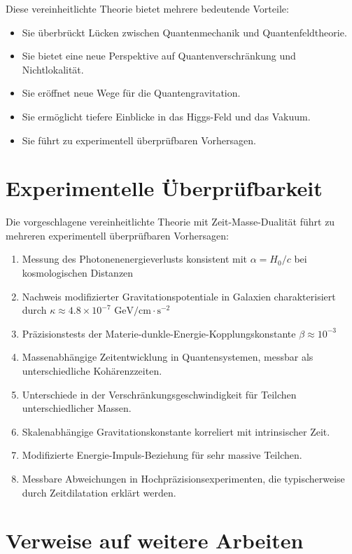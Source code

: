 \documentclass{article}
\begin{document}
	Diese vereinheitlichte Theorie bietet mehrere bedeutende Vorteile:
	\begin{itemize}
		\item Sie überbrückt Lücken zwischen Quantenmechanik und Quantenfeldtheorie.
		\item Sie bietet eine neue Perspektive auf Quantenverschränkung und Nichtlokalität.
		\item Sie eröffnet neue Wege für die Quantengravitation.
		\item Sie ermöglicht tiefere Einblicke in das Higgs-Feld und das Vakuum.
		\item Sie führt zu experimentell überprüfbaren Vorhersagen.
	\end{itemize}
	
	\section{Experimentelle Überprüfbarkeit}
	
	Die vorgeschlagene vereinheitlichte Theorie mit Zeit-Masse-Dualität führt zu mehreren experimentell überprüfbaren Vorhersagen:
	
	\begin{enumerate}
		\item Messung des Photonenenergieverlusts konsistent mit $\alpha = H_0/c$ bei kosmologischen Distanzen
		\item Nachweis modifizierter Gravitationspotentiale in Galaxien charakterisiert durch $\kappa \approx 4.8 \times 10^{-7} \text{ GeV/cm}\cdot\text{s}^{-2}$
		\item Präzisionstests der Materie-dunkle-Energie-Kopplungskonstante $\beta \approx 10^{-3}$
		\item Massenabhängige Zeitentwicklung in Quantensystemen, messbar als unterschiedliche Kohärenzzeiten.
		\item Unterschiede in der Verschränkungsgeschwindigkeit für Teilchen unterschiedlicher Massen.
		\item Skalenabhängige Gravitationskonstante korreliert mit intrinsischer Zeit.
		\item Modifizierte Energie-Impuls-Beziehung für sehr massive Teilchen.
		\item Messbare Abweichungen in Hochpräzisionsexperimenten, die typischerweise durch Zeitdilatation erklärt werden.
	\end{enumerate}
	
	\section{Verweise auf weitere Arbeiten}
	
\end{document}
